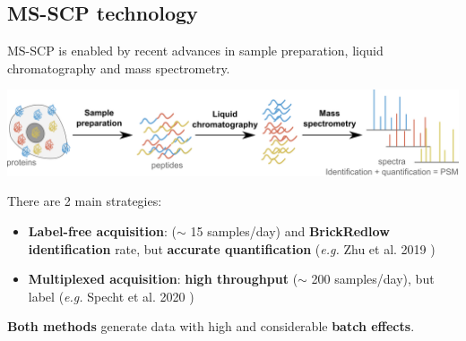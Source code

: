 \documentclass{article}
\begin{document}
\setlength{\columnsep}{0.5cm}
\begin{multicols}{2}

\noindent
\begin{minipage}[t]{\linewidth}
  \vspace{0.5cm}
  \section*{\huge MS-SCP technology}
  
  MS-SCP is enabled by recent advances in sample preparation, liquid
  chromatography and mass spectrometry. 
  
  \includegraphics[width=\linewidth]{figs/MS-SCP.png}
  
  There are 2 main strategies:
  
  \begin{itemize}
  
  \item \textbf{Label-free acquisition}: \textbf{\color{BrickRed}{low 
  throughput}} ($\sim$ 15 samples/day) and \textbf{\color
  {BrickRed}{low identification}} rate, but \textbf{\color{OliveGreen}
  {accurate quantification}} (\textit{e.g.} Zhu et al. 2019 
  \cite{Zhu2019-ja})
  
  \item \textbf{Multiplexed acquisition}: \textbf{\color{OliveGreen}
  {high throughput}} ($\sim$ 200 samples/day), but label 
  \textbf{\color{BrickRed}{cross-contamination}} (\textit{e.g.} Specht
  et al. 2020 \cite{Specht2020-jm})
  
  \end{itemize}
  
  \textbf{Both methods} generate data with high \textbf{\color{
  BrickRed}{missingness}} and considerable \textbf{\color{BrickRed}
  {batch effects}}.
  
\end{minipage}


\noindent
\begin{minipage}[t]{\linewidth}
  \vspace{0.5cm}

\end{minipage}
\end{multicols}
\end{document}

